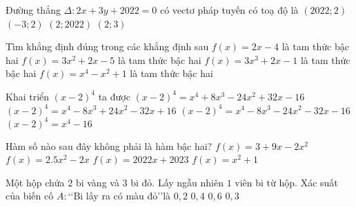 \begin{ex}%
	Đường thẳng $\Delta\colon 2x+3y+2022=0$ có vectơ pháp tuyến có toạ độ là
	\choice
	{$\left(2022;2\right)$}
	{$\left(-3;2\right)$}
	{$\left(2;2022\right)$}
	{\True $\left(2;3\right)$}
\end{ex}
\begin{ex}%
	Tìm khẳng định đúng trong các khẳng định sau
	\choice
	{$f(x)=2x-4$ là tam thức bậc hai}
	{\True $f(x)=3x^2+2x-5$ là tam thức bậc hai}
	{$f(x)=3x^3+2x-1$ là tam thức bậc hai}
	{$f(x)=x^4-x^2+1$ là tam thức bậc hai}
\end{ex}
\begin{ex}%
	Khai triển $\left(x-2\right)^4$ ta được 
	\choice
	{$\left(x-2\right)^4=x^4+8x^3-24x^2+32x-16$}
	{\True $\left(x-2\right)^4=x^4-8x^3+24x^2-32x+16$}
	{$\left(x-2\right)^4=x^4-8x^3-24x^2-32x-16$}
	{$\left(x-2\right)^4=x^4-16$}
\end{ex}
\begin{ex}%
	Hàm số nào sau đây không phải là hàm bậc hai?
	\choice
	{$f(x)=3+9x-2x^2$}
	{$f(x)=2.5x^2-2x$}
	{\True $f(x)=2022x+2023$}
	{$f(x)=x^2+1$}
\end{ex}
\begin{ex}%
	Một hộp chứa $2$ bi vàng và $3$ bi đỏ. Lấy ngẫu nhiên $1$ viên bi từ hộp. Xác suất của biến cố $A\colon$\lq\lq Bi lấy ra có màu đỏ\rq\rq là
	\choice
	{$0{,}2$}
	{$0{,}4$}
	{\True $0{,}6$}
	{$0{,}3$}
\end{ex}
